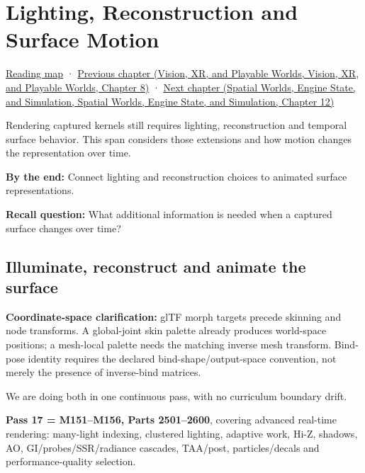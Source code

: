 \hypertarget{04-visual-computing-ii-ch040}{}
\chapter{Lighting, Reconstruction and Surface Motion}\label{stagechapter:04-visual-computing-ii-ch040}\label{04-visual-computing-ii-ch040-lighting-reconstruction-and-surface-motion}

\hyperref[volume-reading-map]{Reading map} · \href{../07-Vision-XR-and-Playable-Worlds/main.pdf\#nameddest=04-visual-computing-ii-ch039-tiling-ordering-and-compositing-at-scale}{Previous chapter (Vision, XR, and Playable Worlds, Vision, XR, and Playable Worlds, Chapter 8)} · \href{../05-Spatial-Worlds-Engine-State-and-Simulation/main.pdf\#nameddest=04-visual-computing-ii-ch041-per-vertex-and-per-corner-mesh-attributes}{Next chapter (Spatial Worlds, Engine State, and Simulation, Spatial Worlds, Engine State, and Simulation, Chapter 12)}

Rendering captured kernels still requires lighting, reconstruction and temporal surface behavior. This span considers those extensions and how motion changes the representation over time.

\textbf{By the end:} Connect lighting and reconstruction choices to animated surface representations.

\textbf{Recall question:} What additional information is needed when a captured surface changes over time?

\section{Illuminate, reconstruct and animate the surface}\label{04-visual-computing-ii-ch040-illuminate-reconstruct-and-animate-the-surface}

\textbf{Coordinate-space clarification:} glTF morph targets precede skinning and node transforms. A global-joint skin palette already produces world-space positions; a mesh-local palette needs the matching inverse mesh transform. Bind-pose identity requires the declared bind-shape/output-space convention, not merely the presence of inverse-bind matrices.

We are doing both in one continuous pass, with no curriculum boundary drift.

\textbf{Pass 17 = M151--M156, Parts 2501--2600}, covering advanced real-time rendering: many-light indexing, clustered lighting, adaptive work, Hi-Z, shadows, AO, GI/probes/SSR/radiance cascades, TAA/post, particles/decals and performance-quality selection.


